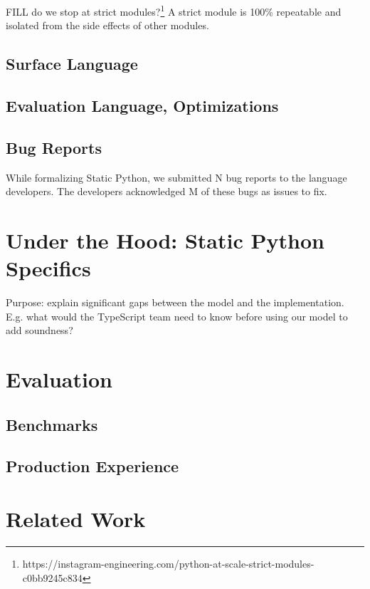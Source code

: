\documentclass[a4paper,english,cleveref,autoref,thm-restate,anonymous,]{lipics-v2021}
\begin{document}
FILL do we stop at strict modules?\footnote{https://instagram-engineering.com/python-at-scale-strict-modules-c0bb9245c834}
A strict module is 100\% repeatable and isolated from the side effects of other modules.



\subsection{Surface Language}


\subsection{Evaluation Language, Optimizations}


\subsection{Bug Reports}

While formalizing Static Python, we submitted N bug reports to the language developers.
The developers acknowledged M of these bugs as issues to fix.


\section{Under the Hood: Static Python Specifics}
\label{s:impl}

Purpose: explain significant gaps between the model and the implementation.
E.g. what would the TypeScript team need to know before using our model
to add soundness?


\section{Evaluation}
\label{s:eval}


\subsection{Benchmarks}


\subsection{Production Experience}


\section{Related Work}
\label{s:related}
\end{document}
